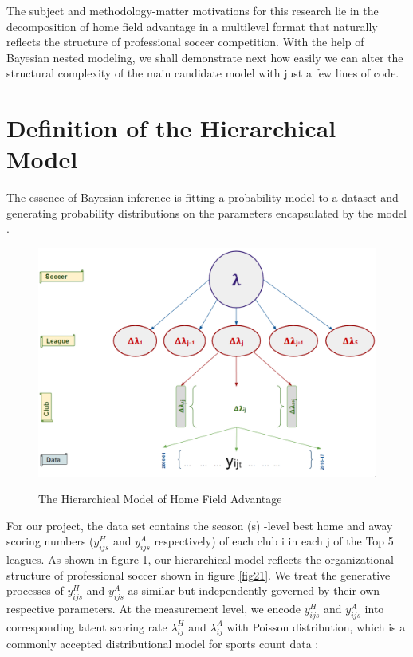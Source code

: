 \documentclass[USenglish]{article}
\begin{document}
The subject and methodology-matter motivations for this research lie in the decomposition of home field advantage in a multilevel format that naturally reflects the structure of professional soccer competition. With the help of Bayesian nested modeling, we shall demonstrate next how easily we can alter the structural complexity of the main candidate model with just a few lines of code.

\section{Definition of the Hierarchical Model} 

The essence of Bayesian inference is fitting a probability model to a dataset and generating probability distributions on the parameters encapsulated by the model \citep{Gelman2014}.

\begin{figure}
\caption{The Hierarchical Model of Home Field Advantage }
{\includegraphics[width=1.0\linewidth]{HFA_33}}
\label{fig33}
\end{figure} 

 
For our project, the data set contains the season (s) -level best home and away scoring numbers ($y^H_{ijs}$ and   $y^A_{ijs}$ respectively) of each club i in each j of the Top 5 leagues. As shown in figure \ref{fig33}, our hierarchical model reflects the organizational structure of professional soccer shown in figure \ref{fig21}. We treat the generative processes of $y^H_{ijs}$ and $y^A_{ijs}$ as similar but independently governed by their own respective parameters. At the measurement level, we encode $y^H_{ijs}$ and $y^A_{ijs}$ into corresponding latent scoring rate $\lambda^H_{ij}$ and $\lambda^A_{ij}$ with Poisson distribution, which is a commonly accepted distributional model for sports count data \citep{Miller2015}:
\end{document}
